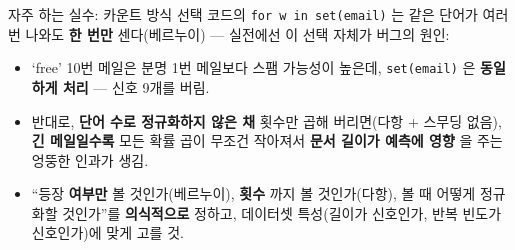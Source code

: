 \begin{frame}{자주 하는 실수: 카운트 방식 선택}
  코드의 \texttt{for w in set(email)} 는 같은 단어가 여러 번 나와도
  \textbf{한 번만} 센다(베르누이) --- 실전에선 이 선택 자체가 버그의
  원인:
  \begin{itemize}
    \item `free' 10번 메일은 분명 1번 메일보다 스팸 가능성이 높은데,
      \texttt{set(email)} 은 \textbf{동일하게 처리} --- 신호 9개를
      버림.
    \item 반대로, \textbf{단어 수로 정규화하지 않은 채} 횟수만 곱해
      버리면(다항 + 스무딩 없음), \textbf{긴 메일일수록} 모든
      확률 곱이 무조건 작아져서 \textbf{문서 길이가 예측에 영향}
      을 주는 엉뚱한 인과가 생김.
    \item ``등장 \textbf{여부만} 볼 것인가(베르누이), \textbf{횟수}
      까지 볼 것인가(다항), 볼 때 어떻게 정규화할 것인가''를
      \textbf{의식적으로} 정하고, 데이터셋 특성(길이가 신호인가,
      반복 빈도가 신호인가)에 맞게 고를 것.
  \end{itemize}
\end{frame}
